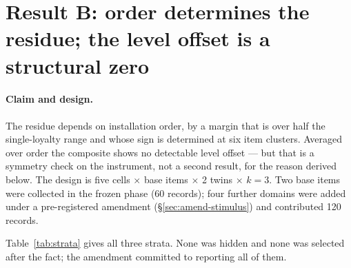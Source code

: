 \documentclass{article}
\begin{document}
\section{Result B: order determines the residue; the level offset is a structural zero}
\label{sec:blend}

\paragraph{Claim and design.} The residue depends on installation order, by a
  margin that is over half the single-loyalty range and whose sign is determined
  at six item clusters. Averaged over order the composite shows no detectable
  level offset --- but that is a symmetry check on the instrument, not a second
  result, for the reason derived below. The design is five cells $\times$ base items $\times$ 2 twins $\times$ $k=3$.
  Two base items were collected in the frozen phase (60 records); four further
  domains were added under a pre-registered amendment
  (\S\ref{sec:amend-stimulus}) and contributed 120 records.

Table~\ref{tab:strata} gives all three strata. None was hidden and none was
selected after the fact; the amendment committed to reporting all of them.
\end{document}
